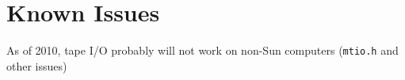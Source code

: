 







\chapter{Known Issues}

As of 2010, tape I/O probably will not work on non-Sun computers
(\texttt{mtio.h} and other issues)

